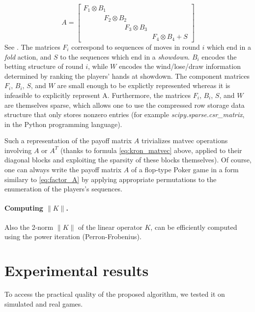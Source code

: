 \documentclass{article} %
\begin{document}
\begin{equation}
  A = \begin{bmatrix}F_1 \otimes B_1\hspace{10em}\\\hspace{3em}F_2
    \otimes B_2\hspace{7em}\\\hspace{6em}F_3 \otimes
    B_3\hspace{4em}\\\hspace{10em}F_4 \otimes B_4 + S \end{bmatrix}
\label{eq:factor_A}
\end{equation}
See \cite{hoda2010smoothing}. The matrices $F_i$ correspond to
sequences of moves in round $i$ which end in a \textit{fold} action,
and $S$ to the sequences which end in a \textit{showdown}. $B_i$
encodes the betting structure of round $i$, while $W$ encodes the
wind/lose/draw information determined by ranking the players' hands at
showdown. The component matrices $F_i$, $B_i$, $S$, and $W$ are small
enough to be explictly represented whereas it is infeasible to
explicitly represent A. Furthermore, the matrices $F_i$, $B_i$,
$S$, and $W$ are themselves sparse, which allows one to use the
compressed row storage data structure that only stores nonzero entries
(for example \textit{scipy.sparse.csr\_matrix}, in the Python
programming language).

Such a representation of the payoff matrix $A$ trivializes matvec
operations involving $A$ or $A^T$ (thanks to formula
\eqref{eq:kron_matvec} above, applied to their diagonal blocks and
exploiting the sparsity of these blocks themselves). Of course, one
can always write the payoff matrix $A$ of a flop-type Poker game in a
form similary to \eqref{eq:factor_A} by applying appropriate
permutations to the enumeration of the players's sequences.

\paragraph{\textbf{Computing $\|K\|$.}}
Also the 2-norm $\|K\|$ of the linear operator $K$, can be efficiently
computed using the power iteration (Perron-Frobenius).

\section{Experimental results}
\label{sec:results}
To access the practical quality of the proposed algorithm, we
tested it on simulated and real games.
\end{document}
